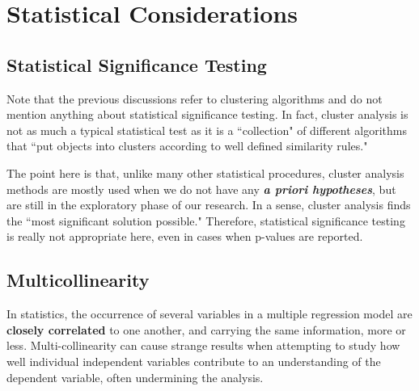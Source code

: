 \documentclass[SKLCluster.tex]{subfiles}
\begin{document}
\section{Statistical Considerations}
\subsection{Statistical Significance Testing}

Note that the previous discussions refer to clustering algorithms and do not mention anything about statistical significance testing. In fact, cluster analysis is not as much a typical statistical test as it is a ``collection" of different algorithms that ``put objects into clusters according to well defined similarity rules."

The point here is that, unlike many other statistical procedures, cluster analysis methods are mostly used when we do not have any \textbf{\textit{a priori hypotheses}}, but are still in the exploratory phase of our research. In a sense, cluster analysis finds the ``most significant solution possible." Therefore, statistical significance testing is really not appropriate here, even in cases when p-values are reported.

\subsection{Multicollinearity}
In statistics, the occurrence of several  variables in a multiple regression model are \textbf{closely correlated} to one another, and carrying the same information, more or less. Multi-collinearity can cause strange results when attempting to study how well individual independent variables contribute to an understanding of the dependent variable, often undermining the analysis.
\end{document}

